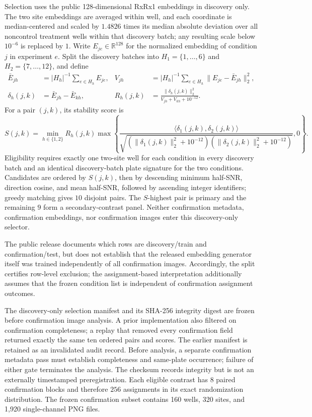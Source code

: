 \documentclass[11pt]{article}
\theoremstyle{definition}
\theoremstyle{remark}
\newcommand{\bR}{\mathbb R}
\newcommand{\1}{\mathbf 1}
\providecommand{\RxSelectedPairs}{10}
\providecommand{\RxReplicationPairs}{9}
\providecommand{\RxConfirmationBlocks}{8}
\providecommand{\RxPermutationCount}{256}
\begin{document}
Selection uses the public 128-dimensional RxRx1 embeddings in discovery only.
The two site embeddings are averaged within well, and each coordinate is
median-centered and scaled by \(1.4826\) times its median absolute deviation
over all noncontrol treatment wells within that discovery batch; any resulting
scale below \(10^{-6}\) is replaced by \(1\).  Write \(E_{je}\in\bR^{128}\) for the normalized
embedding of condition \(j\) in experiment \(e\).  Split the discovery batches
into \(H_1=\{1,\ldots,6\}\) and \(H_2=\{7,\ldots,12\}\), and define
\[
\begin{aligned}
 \bar E_{jh}&=|H_h|^{-1}\sum_{e\in H_h}E_{je},&
 V_{jh}&=|H_h|^{-1}\sum_{e\in H_h}
          \|E_{je}-\bar E_{jh}\|_2^2,\\
 \delta_h(j,k)&=\bar E_{jh}-\bar E_{kh},&
 R_h(j,k)&=\frac{\|\delta_h(j,k)\|_2^2}
 {V_{jh}+V_{kh}+10^{-12}} .
\end{aligned}
\]
For a pair \((j,k)\), its stability score is
\begin{equation}\label{eq:selection-score}
 S(j,k)=
 \min_{h\in\{1,2\}}R_h(j,k)
 \max\left\{
 \frac{\langle\delta_1(j,k),\delta_2(j,k)\rangle}
 {\sqrt{(\|\delta_1(j,k)\|_2^2+10^{-12})
        (\|\delta_2(j,k)\|_2^2+10^{-12})}},
 0\right\}.
\end{equation}
Eligibility requires exactly one two-site well for each condition in every
discovery batch and an identical discovery-batch plate signature for the two
conditions.  Candidates are ordered by \(S(j,k)\), then by descending minimum
half-SNR, direction cosine, and mean half-SNR, followed by ascending integer
identifiers; greedy matching gives
\(\RxSelectedPairs\) disjoint pairs.  The \(S\)-highest pair is primary and the
remaining \(\RxReplicationPairs\) form a secondary-contrast panel.
Neither confirmation metadata, confirmation embeddings, nor confirmation
images enter this discovery-only selector.

The public release documents which rows are discovery/train and
confirmation/test, but does not establish that the released embedding
generator itself was trained independently of all confirmation images.
Accordingly, the split certifies row-level exclusion; the assignment-based
interpretation additionally assumes that the frozen condition list is
independent of confirmation assignment outcomes.

The discovery-only selection manifest and its SHA-256 integrity digest are
frozen before confirmation image analysis.  A prior implementation also
filtered on confirmation completeness; a replay that removed every
confirmation field returned exactly the same ten ordered pairs and scores.
The earlier manifest is retained as an invalidated audit record.  Before
analysis, a separate confirmation metadata pass must establish completeness
and same-plate occurrence; failure of either gate terminates the analysis.
The checksum records integrity but is not an externally timestamped
preregistration.  Each eligible contrast has
\(\RxConfirmationBlocks\) paired confirmation blocks and therefore
\(\RxPermutationCount\) assignments in its exact randomization distribution.
The frozen confirmation subset contains 160 wells, 320 sites, and 1,920
single-channel PNG files.
\end{document}
